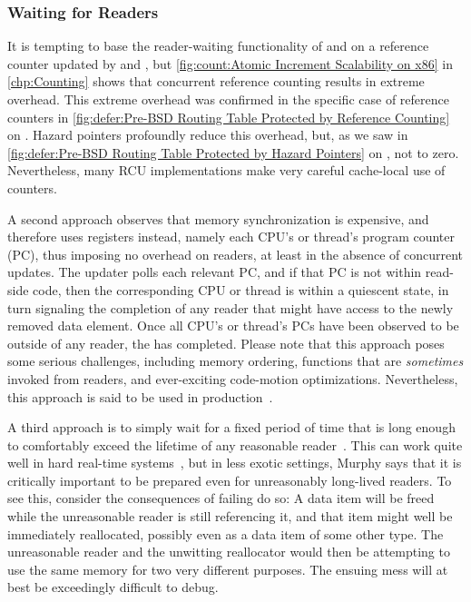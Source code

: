 \subsubsection{Waiting for Readers}
\label{sec:defer:Waiting for Readers}

It is tempting to base the reader-waiting functionality of
 and  on a reference counter
updated by  and , but
\cref{fig:count:Atomic Increment Scalability on x86}
in
\cref{chp:Counting}
shows that concurrent reference counting results in extreme overhead.
This extreme overhead was confirmed in the specific case of
reference counters in
\cref{fig:defer:Pre-BSD Routing Table Protected by Reference Counting}
on
.
Hazard pointers profoundly reduce this overhead, but, as we saw in
\cref{fig:defer:Pre-BSD Routing Table Protected by Hazard Pointers}
on
,
not to zero.
Nevertheless, many RCU implementations make very careful cache-local
use of counters.

A second approach observes that memory synchronization is expensive,
and therefore uses registers instead, namely each CPU's or thread's
program counter (PC), thus imposing no overhead on readers, at least
in the absence of concurrent updates.
The updater polls each relevant PC, and if that PC is not within read-side
code, then the corresponding CPU or thread is within a quiescent state,
in turn signaling the completion of any reader that might have access
to the newly removed data element.
Once all CPU's or thread's PCs have been observed to be outside of any
reader, the  has completed.
Please note that this approach poses some serious challenges, including
memory ordering, functions that are \emph{sometimes} invoked from readers,
and ever-exciting code-motion optimizations.
Nevertheless, this approach is said to be used in
production~\cite{MikeAsh2015Apple}.

A third approach is to simply wait for a fixed period of time that is
long enough to comfortably exceed the lifetime of any reasonable
reader~\cite{Jacobson93,AjuJohn95}.
This can work quite well in hard real-time systems~\cite{YuxinRen2018RTRCU},
but in less exotic
settings, Murphy says that it is critically important to be prepared
even for unreasonably long-lived readers.
To see this, consider the consequences of failing do so:
A data item will be freed while the unreasonable reader is still
referencing it, and that item might well be immediately reallocated,
possibly even as a data item of some other type.
The unreasonable reader and the unwitting reallocator would then
be attempting to use the same memory for two very different purposes.
The ensuing mess will at best be exceedingly difficult to debug.


